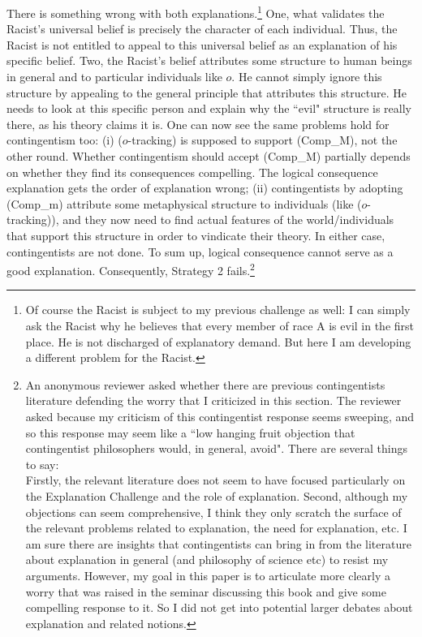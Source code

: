 There is something wrong with both explanations.\footnote{Of course the Racist is subject to my previous challenge as well: I can simply ask the Racist why he believes that every member of race A is evil in the first place. He is not discharged of explanatory demand. But here I am developing a different problem for the Racist.} 
One, what validates the Racist's universal belief is precisely the character of each individual. Thus, the Racist is not entitled to appeal to this universal belief as an explanation of his specific belief. Two, the Racist's belief attributes some structure to human beings in general and to particular individuals like $o$. He cannot simply ignore this structure by appealing to the general principle that attributes this structure. He needs to look at this specific person and explain why the ``evil" structure is really there, as his theory claims it is. 
One can now see the same problems hold for contingentism too: (i) ($o$-tracking) is supposed to support (Comp_M), not the other round. Whether contingentism should accept (Comp_M) partially depends on whether they find its consequences compelling. The logical consequence explanation gets the order of explanation wrong; (ii) contingentists by adopting (Comp_m) attribute some metaphysical structure to individuals (like ($o$-tracking)), and they now need to find actual features of the world/individuals that support this structure in order to vindicate their theory. In either case, contingentists are not done.
To sum up, logical consequence cannot serve as a good explanation. Consequently, Strategy 2 fails.\footnote{An anonymous reviewer asked whether there are previous contingentists literature defending the worry that I criticized in this section. The reviewer asked because my criticism of this contingentist response seems sweeping, and so this response may seem like a ``low hanging fruit objection that contingentist philosophers would, in general, avoid". There are several things to say: \\
Firstly, the relevant literature does not seem to have focused particularly on the Explanation Challenge and the role of explanation. 
Second, although my objections can seem comprehensive, I think they only scratch the surface of the relevant problems related to explanation, the need for explanation, etc. I am sure there are insights that contingentists can bring in from the literature about explanation in general (and philosophy of science etc) to resist my arguments. However, my goal in this paper is to articulate more clearly a worry that was raised in the seminar discussing this book and give some compelling response to it. So I did not get into potential larger debates about explanation and related notions.}

